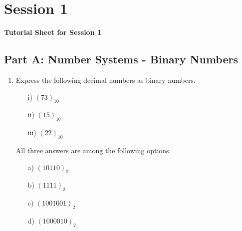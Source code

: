 \documentclass[]{report}
\begin{document}
\chapter{Session 1}

\begin{center}
	\textbf{Tutorial Sheet for Session 1}
\end{center}
\section*{Part A: Number Systems - Binary Numbers}
\begin{enumerate}
	\item Express the following decimal numbers as binary numbers.
	\begin{multicols}{4}
		\begin{itemize}
			\item[i)] $(73)_{10}$
			\item[ii)] $(15)_{10}$
			\item[iii)] $(22)_{10}$
		\end{itemize}
	\end{multicols}
	
	All three answers are among the following options.
	\begin{multicols}{4}
		\begin{itemize}
			\item[a)] $(10110)_{2}$ %
			\item[b)] $(1111)_{2}$ %
			\item[c)] $(1001001)_{2}$ %
			\item[d)] $(1000010)_{2}$ %
		\end{itemize}
	\end{multicols}
	

\end{enumerate}
\end{document}
